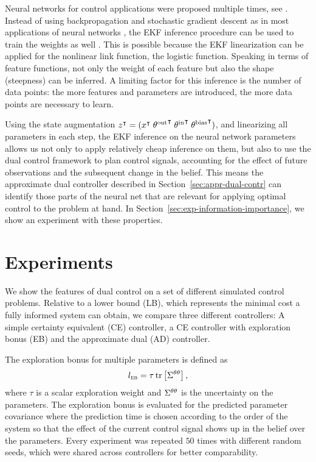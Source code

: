 Neural networks for control applications were proposed multiple times, see \eg
{}. Instead of using backpropagation and
stochastic gradient descent as in most applications of neural networks
, the
EKF inference procedure can be used to train the weights as well
. This is possible because the EKF
linearization  can be applied for the
nonlinear link function, \eg the logistic function. Speaking in terms of feature
functions, not only the weight of each feature but also the shape (steepness)
can be inferred. A limiting factor for this inference is the number of
data points: the more features and parameters are introduced, the more data
points are necessary to learn.

Using the state augmentation $z^{\intercal} = (x^{\intercal} \; {{\theta}^\text{out}}^{\intercal} \;
{{\theta}^\text{in}}^{\intercal} \; {{\theta}^\text{bias}}^{\intercal})$, and linearizing \wrt
all parameters in each step, the EKF inference on the neural network parameters
allows us not only to apply relatively cheap inference on them, but also to use
the dual control framework to plan control signals, accounting for the effect
of future observations and the subsequent change in the belief. This means the
approximate dual controller described in Section~\ref{sec:appr-dual-contr} can
identify those parts of the neural net that are relevant for applying optimal
control to the problem at hand. In Section~\ref{sec:exp-information-importance},
we show an experiment with these properties.

\section{Experiments}
\label{sec:nonlinear-experiments}

We show the features of dual control on a set of different simulated control
problems. Relative to a lower bound (LB), which represents the minimal cost a
fully informed system can obtain, we compare three different controllers: A
simple certainty equivalent (CE) controller, a CE controller with exploration
bonus (EB) and the approximate dual (AD) controller.

The exploration bonus
\cite{Wittenmark:1975:Active}
for multiple parameters is defined as
\begin{equation}
  l_{\normalfont\textsc{eb}} =  \tau \operatorname*{tr}\left[\Sigma^{\theta\theta}\right],
\end{equation}
where $\tau$ is a scalar exploration weight and $\Sigma^{\theta\theta}$ is the
uncertainty on the parameters. The exploration bonus is evaluated for the
predicted parameter covariance where the prediction time is chosen according to
the order of the system so that the effect of the current control signal shows
up in the belief over the parameters. Every experiment was repeated $50$ times
with different random seeds, which were shared across controllers for better
comparability.

